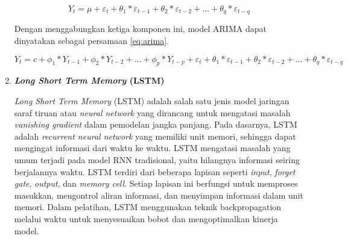 \begin{enumerate}
    \begin{equation}
        \label{eq:ma}
        Y_t = \mu + \varepsilon_t + \theta_1 * \varepsilon_{t-1} + \theta_2 * \varepsilon_{t-2} + ... + \theta_q * \varepsilon_{t-q}
    \end{equation}

    Dengan menggabungkan ketiga komponen ini, model ARIMA dapat dinyatakan sebagai persamaan \ref{eq:arima}.

    \begin{equation}
        \label{eq:arima}
        Y_t = c + \phi_1 * Y_{t-1} + \phi_2 * Y_{t-2} + ... + \phi_p * Y_{t-p} + \varepsilon_t + \theta_1 * \varepsilon_{t-1} + \theta_2 * \varepsilon_{t-2} + ... + \theta_q * \varepsilon_{t-q}
    \end{equation}

    \item \textbf{\textit{Long Short Term Memory} (LSTM)}
    
    \textit{Long Short Term Memory} (LSTM) adalah salah satu jenis model jaringan saraf tiruan atau \textit{neural network} yang dirancang untuk mengatasi masalah \textit{vanishing gradient} dalam pemodelan jangka panjang. Pada dasarnya, LSTM adalah \textit{recurrent neural network} yang memiliki unit memori, sehingga dapat mengingat informasi dari waktu ke waktu. LSTM mengatasi masalah yang umum terjadi pada model RNN tradisional, yaitu hilangnya informasi seiring berjalannya waktu. LSTM terdiri dari beberapa lapisan seperti \textit{input}, \textit{forget gate}, \textit{output}, dan \textit{memory cell}. Setiap lapisan ini berfungsi untuk memproses masukkan, mengontrol aliran informasi, dan menyimpan informasi dalam unit memori. Dalam pelatihan, LSTM menggunakan teknik backpropagation melalui waktu untuk menyesuaikan bobot dan mengoptimalkan kinerja model. 

\end{enumerate}
